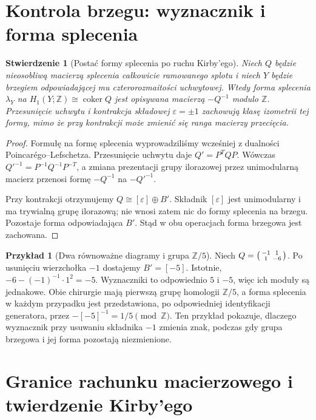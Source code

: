 \documentclass[11pt,a4paper]{report}
\numberwithin{equation}{section}
\theoremstyle{plain}
\newtheorem{stwierdzenie}[twierdzenie]{Stwierdzenie}
\theoremstyle{definition}
\newtheorem{przyklad}[twierdzenie]{Przykład}
\theoremstyle{remark}
\begin{document}
\section{Kontrola brzegu: wyznacznik i forma splecenia}
\label{sec:tg-kirby-linking}

\begin{stwierdzenie}[Postać formy splecenia po ruchu Kirby'ego]
Niech $Q$ będzie nieosobliwą macierzą splecenia
całkowicie ramowanego splotu i niech $Y$ będzie
brzegiem odpowiadającej mu czterorozmaitości uchwytowej.
Wtedy forma splecenia $\lambda_Y$ na
$H_1(Y;\mathbb Z)\cong\operatorname{coker}Q$ jest
opisywana macierzą $-Q^{-1}$ modulo $\mathbb Z$.
Przesunięcie uchwytu i kontrakcja składowej
$\varepsilon=\pm1$ zachowują klasę izometrii
tej formy, mimo że przy kontrakcji może zmienić
się ranga macierzy przecięcia.
\end{stwierdzenie}
\begin{proof}
Formułę na formę splecenia wyprowadziliśmy wcześniej
z dualności Poincarégo--Lefschetza. Przesunięcie
uchwytu daje $Q'=P^TQP$. Wówczas
${Q'}^{-1}=P^{-1}Q^{-1}P^{-T}$, a zmiana
prezentacji grupy ilorazowej przez unimodularną
macierz przenosi formę $-Q^{-1}$ na $-{Q'}^{-1}$.

Przy kontrakcji otrzymujemy
$Q\cong[\varepsilon]\oplus B'$.
Składnik $[\varepsilon]$ jest unimodularny i ma
trywialną grupę ilorazową; nie wnosi zatem nic do
formy splecenia na brzegu. Pozostaje forma
odpowiadająca $B'$. Stąd w obu operacjach
forma brzegowa jest zachowana.
\end{proof}

\begin{przyklad}[Dwa równoważne diagramy i grupa $\mathbb Z/5$]
Niech $Q=\begin{psmallmatrix}-1&1\\1&-6\end{psmallmatrix}$.
Po usunięciu wierzchołka $-1$ dostajemy $B'=[-5]$.
Istotnie, $-6-(-1)^{-1}\cdot1^2=-5$.
Wyznaczniki to odpowiednio $5$ i $-5$,
więc ich moduły są jednakowe. Obie chirurgie
mają pierwszą grupę homologii $\mathbb Z/5$,
a forma splecenia w każdym przypadku jest
przedstawiona, po odpowiedniej identyfikacji
generatora, przez $-[-5]^{-1}=1/5\pmod{\mathbb Z}$.
Ten przykład pokazuje, dlaczego wyznacznik
przy usuwaniu składnika $-1$ zmienia znak, podczas
gdy grupa brzegowa i jej forma pozostają niezmienione.
\end{przyklad}

\section{Granice rachunku macierzowego i twierdzenie Kirby'ego}
\label{sec:tg-kirby-scope}
\end{document}
